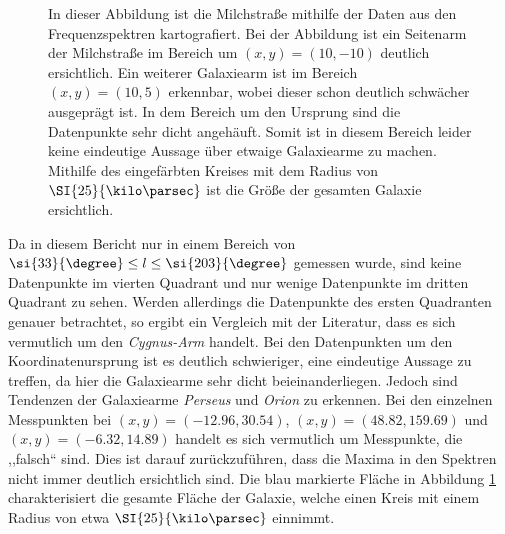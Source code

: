\begin{figure}[H]
    \centering
       
    \caption[Abbildung der Milchstraße]{In dieser Abbildung ist die Milchstraße mithilfe der Daten aus den Frequenzspektren kartografiert. Bei der Abbildung ist ein Seitenarm der Milchstraße im Bereich um $(x,y)=(10,-10)$ deutlich ersichtlich. Ein weiterer Galaxiearm ist im Bereich $(x,y)=(10,5)$ erkennbar, wobei dieser schon deutlich schwächer ausgeprägt ist. In dem Bereich um den Ursprung sind die Datenpunkte sehr dicht angehäuft. Somit ist in diesem Bereich leider keine eindeutige Aussage über etwaige Galaxiearme zu machen. Mithilfe des eingefärbten Kreises mit dem Radius von $\SI{25}{\kilo \parsec}$ ist die Größe der gesamten Galaxie ersichtlich.}
    \label{fig:Milchstrassesafe}
\end{figure}
\newpage
Da in diesem Bericht nur in einem Bereich von $\si{33}{\degree} \le l \le \si{203}{\degree}$ gemessen wurde, sind keine Datenpunkte im vierten Quadrant und nur wenige Datenpunkte im dritten Quadrant zu sehen.
Werden allerdings die Datenpunkte des ersten Quadranten genauer betrachtet, so ergibt ein Vergleich mit der Literatur, dass es sich vermutlich um den \textit{Cygnus-Arm} handelt. Bei den Datenpunkten um den Koordinatenursprung ist es deutlich schwieriger, eine eindeutige Aussage zu treffen, da hier die Galaxiearme sehr dicht beieinanderliegen. Jedoch sind Tendenzen der Galaxiearme \textit{Perseus} und \textit{Orion} zu erkennen. Bei den einzelnen Messpunkten bei $(x,y)=(-12.96, 30.54)$, $(x,y)=(48.82, 159.69)$ und $(x,y)=(-6.32, 14.89)$ handelt es sich vermutlich um Messpunkte, die ,,falsch`` sind. Dies ist darauf zurückzuführen, dass die Maxima in den Spektren nicht immer deutlich ersichtlich sind. Die blau markierte Fläche in Abbildung \ref{fig:Milchstrassesafe} charakterisiert die gesamte Fläche der Galaxie, welche einen Kreis mit einem Radius von etwa $\SI{25}{\kilo \parsec}$ einnimmt.

